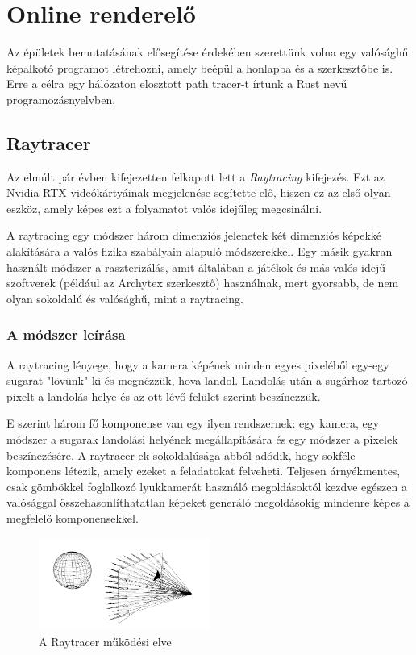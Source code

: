 \section{Online renderelő}
\label{raytracer}

Az épületek bemutatásának elősegítése érdekében szerettünk volna egy valósághű képalkotó programot létrehozni, amely beépül a honlapba és a szerkesztőbe is. Erre a célra egy hálózaton elosztott path tracer-t írtunk a Rust nevű programozásnyelvben.

\subsection{Raytracer}
Az elmúlt pár évben kifejezetten felkapott lett a \emph{Raytracing} kifejezés. Ezt az Nvidia RTX videókártyáinak megjelenése segítette elő, hiszen ez az első olyan eszköz, amely képes ezt a folyamatot valós idejűleg megcsinálni.

A raytracing egy módszer három dimenziós jelenetek két dimenziós képekké alakítására a valós fizika szabályain alapuló módszerekkel. Egy másik gyakran használt módszer a raszterizálás, amit általában a játékok és más valós idejű szoftverek (például az Archytex szerkesztő) használnak, mert gyorsabb, de nem olyan sokoldalú és valósághű, mint a raytracing.


\subsubsection{A módszer leírása}
A raytracing lényege, hogy a kamera képének minden egyes pixeléből egy-egy sugarat "lövünk" ki és megnézzük, hova landol. Landolás után a sugárhoz tartozó pixelt a landolás helye és az ott lévő felület szerint beszínezzük.

E szerint három fő komponense van egy ilyen rendszernek: egy kamera, egy módszer a sugarak landolási helyének megállapítására és egy módszer a pixelek beszínezésére. A raytracer-ek sokoldalúsága abból adódik, hogy sokféle komponens létezik, amely ezeket a feladatokat felveheti. Teljesen árnyékmentes, csak gömbökkel foglalkozó lyukkamerát használó megoldásoktól kezdve egészen a valósággal összehasonlíthatatlan képeket generáló megoldásokig mindenre képes a megfelelő komponensekkel.

\begin{figure}[H]
    \centering
    \includegraphics[width=0.5\textwidth]{parts/developer-documentation/ray-tracer/images/figure.png}
    \caption{A Raytracer működési elve}
\end{figure}
